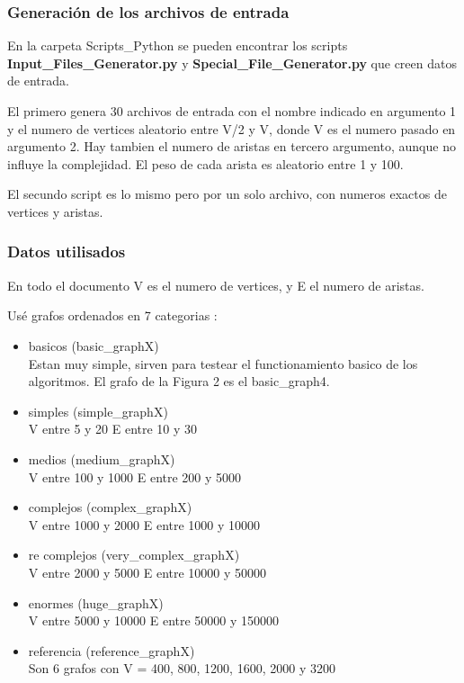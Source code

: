 \documentclass[a4paper,11pt]{article}
\begin{document}
\subsubsection{Generación de los archivos de entrada}

En la carpeta Scripts\_Python se pueden encontrar los scripts \textbf{Input\_Files\_Generator.py} y \textbf{Special\_File\_Generator.py} que creen datos de entrada.

El primero genera 30 archivos de entrada con el nombre indicado en argumento 1 y el numero de vertices aleatorio entre V/2 y V, donde V es el numero pasado en argumento 2. Hay tambien el numero de aristas en tercero argumento, aunque no influye la complejidad. El peso de cada arista es aleatorio entre 1 y 100.

El secundo script es lo mismo pero por un solo archivo, con numeros exactos de vertices y aristas.

\subsubsection{Datos utilisados}

\noindent En todo el documento V es el numero de vertices, y E el numero de aristas.

\noindent Usé grafos ordenados en 7 categorias :

\begin{itemize}
  \item basicos (basic\_graphX)\\
    Estan muy simple, sirven para testear el functionamiento basico de los algoritmos.
    El grafo de la Figura 2 es el basic\_graph4.
  \item simples (simple\_graphX)\\
    V entre 5 y 20
    E entre 10 y 30
  \item medios (medium\_graphX)\\
    V entre 100 y 1000
    E entre 200 y 5000
  \item complejos (complex\_graphX)\\
    V entre 1000 y 2000
    E entre 1000 y 10000
  \item re complejos (very\_complex\_graphX)\\
    V entre 2000 y 5000
    E entre 10000 y 50000
  \item enormes (huge\_graphX)\\
    V entre 5000 y 10000
    E entre 50000 y 150000
  \item referencia (reference\_graphX)\\
    Son 6 grafos con V = 400, 800, 1200, 1600, 2000 y 3200
\end{itemize}
\end{document}
